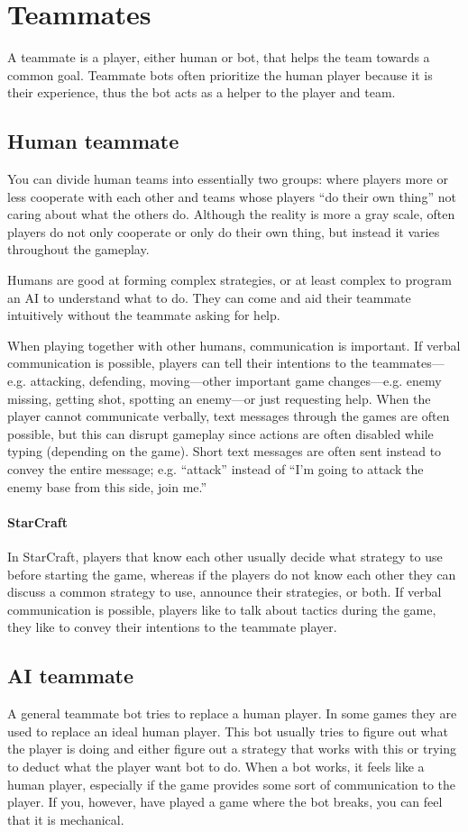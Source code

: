 \section{Teammates} A teammate is a player, either human or bot, that helps the team towards a
common goal. Teammate bots often prioritize the human player because it is their experience, thus
the bot acts as a helper to the player and team.

\subsection{Human teammate} You can divide human teams into essentially two groups: where players
more or less cooperate with each other and teams whose players “do their own thing” not caring about
what the others do. Although the reality is more a gray scale, often players do not only cooperate
or only do their own thing, but instead it varies throughout the gameplay.

Humans are good at forming complex strategies, or at least complex to program an AI to understand
what to do. They can come and aid their teammate intuitively without the teammate asking for help.

When playing together with other humans, communication is important. If verbal communication is
possible, players can tell their intentions to the teammates—e.g. attacking, defending, moving—other
important game changes—e.g. enemy missing, getting shot, spotting an enemy—or just requesting help.
When the player cannot communicate verbally, text messages through the games are often possible, but
this can disrupt gameplay since actions are often disabled while typing (depending on the game).
Short text messages are often sent instead to convey the entire message; e.g. “attack” instead of
“I’m going to attack the enemy base from this side, join me.” 

\paragraph{StarCraft} In StarCraft, players that know each other usually decide what strategy to use
before starting the game, whereas if the players do not know each other they can discuss a common
strategy to use, announce their strategies, or both. If verbal communication is possible, players
like to talk about tactics during the game, they like to convey their intentions to the teammate
player.

\subsection{AI teammate} A general teammate bot tries to replace a human player. In some games they
are used to replace an ideal human player. This bot usually tries to figure out what the player is
doing and either figure out a strategy that works with this or trying to deduct what the player want
bot to do. When a bot works, it feels like a human player, especially if the game provides some sort
of communication to the player. If you, however, have played a game where the bot breaks, you can
feel that it is mechanical.

